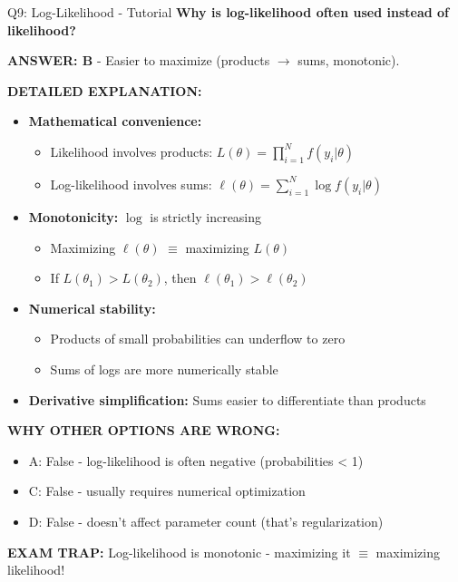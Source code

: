 \documentclass[8pt]{beamer}
\begin{document}
	\begin{frame}{Q9: Log-Likelihood - Tutorial}
		\fontsize{6.5}{7.5}\selectfont
		\textbf{Why is log-likelihood often used instead of likelihood?}
		
		\vspace{0.05cm}
		\textcolor{myblue}{\textbf{ANSWER: B}} - Easier to maximize (products $\to$ sums, monotonic).
		
		\vspace{0.05cm}
		\textbf{DETAILED EXPLANATION:}
		\begin{itemize}
			\item \textbf{Mathematical convenience:}
			\begin{itemize}
				\item Likelihood involves products: $L(\theta) = \prod_{i=1}^N f(y_i|\theta)$
				\item Log-likelihood involves sums: $\ell(\theta) = \sum_{i=1}^N \log f(y_i|\theta)$
			\end{itemize}
			\item \textbf{Monotonicity:} $\log$ is strictly increasing
			\begin{itemize}
				\item Maximizing $\ell(\theta)$ $\equiv$ maximizing $L(\theta)$
				\item If $L(\theta_1) > L(\theta_2)$, then $\ell(\theta_1) > \ell(\theta_2)$
			\end{itemize}
			\item \textbf{Numerical stability:}
			\begin{itemize}
				\item Products of small probabilities can underflow to zero
				\item Sums of logs are more numerically stable
			\end{itemize}
			\item \textbf{Derivative simplification:} Sums easier to differentiate than products
		\end{itemize}
		
		\vspace{0.05cm}
		\textcolor{myred}{\textbf{WHY OTHER OPTIONS ARE WRONG:}}
		\begin{itemize}
			\item \textcolor{myred}{A:} False - log-likelihood is often negative (probabilities < 1)
			\item \textcolor{myred}{C:} False - usually requires numerical optimization
			\item \textcolor{myred}{D:} False - doesn't affect parameter count (that's regularization)
		\end{itemize}
		
		\textcolor{myred}{\textbf{EXAM TRAP:}} Log-likelihood is \textcolor{myblue}{monotonic} - maximizing it $\equiv$ maximizing likelihood!
	\end{frame}
	
\end{document}

